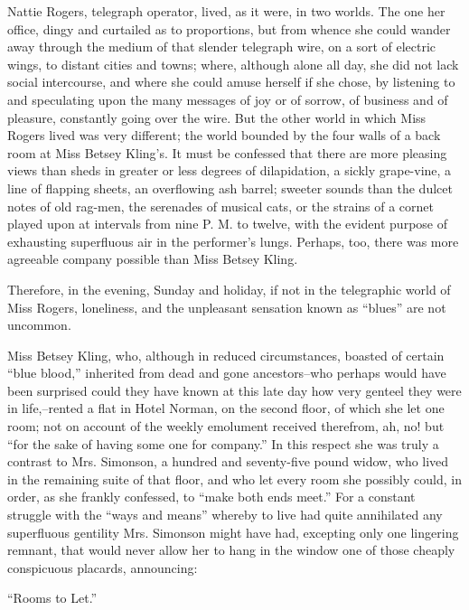  Nattie Rogers, telegraph operator, lived, as it were, in two
worlds. The one her office, dingy and curtailed as to proportions, but
from whence she could wander away through the medium of that slender
telegraph wire, on a sort of electric wings, to distant cities and
towns; where, although alone all day, she did not lack social
intercourse, and where she could amuse herself if she chose, by
listening to and speculating upon the many messages of joy or of sorrow,
of business and of pleasure, constantly going over the wire. But the
other world in which Miss Rogers lived was very different; the world
bounded by the four walls of a back room at Miss Betsey Kling's. It must
be confessed that there are more pleasing views than sheds in greater or
less degrees of dilapidation, a sickly grape-vine, a line of flapping
sheets, an overflowing ash barrel; sweeter sounds than the dulcet notes
of old rag-men, the serenades of musical cats, or the strains of a
cornet played upon at intervals from nine P. M. to twelve, with the
evident purpose of exhausting superfluous air in the performer's lungs.
Perhaps, too, there was more agreeable company possible than Miss Betsey
Kling.

Therefore, in the evening, Sunday and holiday, if not in the telegraphic
world of Miss Rogers, loneliness, and the unpleasant sensation known as
``blues'' are not uncommon.

Miss Betsey Kling, who, although in reduced circumstances, boasted of
certain ``blue blood,'' inherited from dead and gone ancestors--who
perhaps would have been surprised could they have known at this late day
how very genteel they were in life,--rented a flat in Hotel Norman, on
the second floor, of which she let one room; not on account of the
weekly emolument received therefrom, ah, no! but ``for the sake of having
some one for company.'' In this respect she was truly a contrast to Mrs.
Simonson, a hundred and seventy-five pound widow, who lived in the
remaining suite of that floor, and who let every room she possibly
could, in order, as she frankly confessed, to ``make both ends meet.'' For
a constant struggle with the ``ways and means'' whereby to live had quite
annihilated any superfluous gentility Mrs. Simonson might have had,
excepting only one lingering remnant, that would never allow her to hang
in the window one of those cheaply conspicuous placards, announcing:

``Rooms to Let.''

